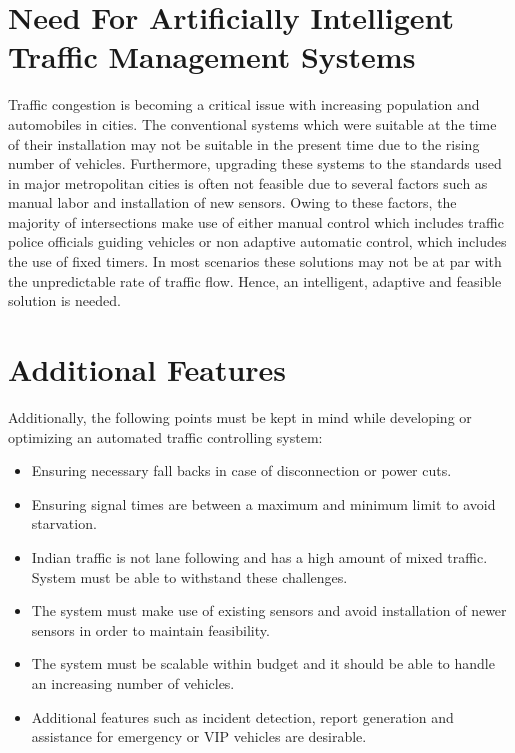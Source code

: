 \documentclass[openany,12pt]{report}
\begin{document}
\section{Need For Artificially Intelligent Traffic Management Systems}
\hspace*{0.5in}Traffic congestion is becoming a critical issue with increasing population and automobiles in cities. The conventional systems which were suitable at the time of their installation may not be suitable in the present time due to the rising number of vehicles. Furthermore, upgrading these systems to the standards used in major metropolitan cities is often not feasible due to several factors such as manual labor and installation of new sensors. Owing to these factors, the majority of intersections make use of either manual control which includes traffic police officials guiding vehicles or non adaptive automatic control, which includes the use of fixed timers. In most scenarios these solutions may not be at par with the unpredictable rate of traffic flow. Hence, an intelligent, adaptive and feasible solution is needed.\\

\section{Additional Features}
\hspace*{0.5in}Additionally, the following points must be kept in mind while developing or optimizing an automated traffic controlling system:\\

\begin{itemize}
	\item{Ensuring necessary fall backs in case of disconnection or power cuts.}
	\item{Ensuring signal times are between a maximum and minimum limit to avoid starvation.}
	\item{Indian traffic is not lane following and has a high amount of mixed traffic. System must be able to withstand these challenges.}
	\item{The system must make use of existing sensors and avoid installation of newer sensors in order to maintain feasibility.}
	\item{The system must be scalable within budget and it should be able to handle an increasing number of vehicles.}
	\item{Additional features such as incident detection, report generation and assistance for emergency or VIP vehicles are desirable.}
\end{itemize}
\end{document}
